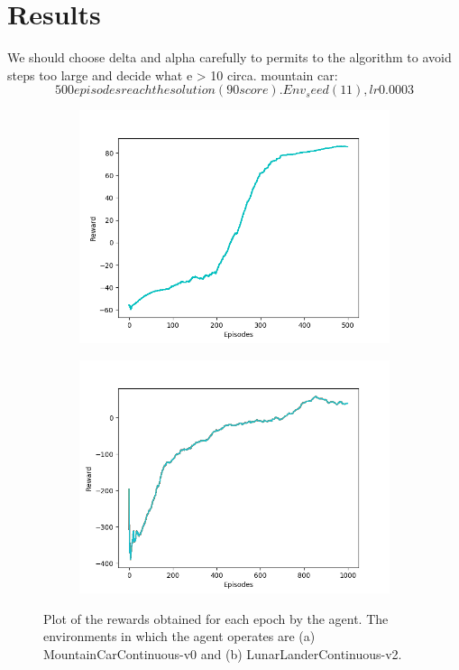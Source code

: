 \documentclass[11pt]{article}
\begin{document}
\section{Results}
We should choose delta and alpha carefully to permits to the algorithm to avoid steps too large and decide what e > 10 circa.
mountain car:
$$500 episodes reach the solution (90 score). Env_seed (11), lr 0.0003$$

\begin{figure}[h!]
        \centering
        \begin{subfigure}[b]{0.6\linewidth}
                \includegraphics[width=\linewidth]{mountain_plot}
                \caption{}
        \end{subfigure}
        \begin{subfigure}[b]{0.6\linewidth}
                \includegraphics[width=\linewidth]{lunar_plot}
                \caption{}
        \end{subfigure}

        \caption{ Plot of the rewards obtained for each epoch by the agent. The environments in which the agent operates are (a) MountainCarContinuous-v0 and (b) LunarLanderContinuous-v2.}
        \label{fig:plots}
\end{figure}
\end{document}
